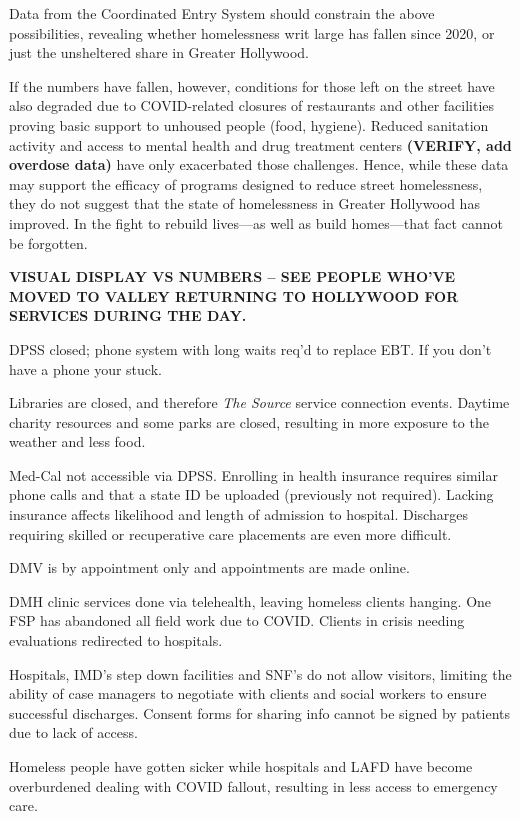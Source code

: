 \documentclass[11pt]{article}
\def\bfr{\bf\color{red}}
\begin{document}
Data from the Coordinated Entry System should constrain the above possibilities, revealing whether homelessness 
writ large has fallen since 2020, or just the unsheltered share in Greater Hollywood.

If the numbers have fallen, however, conditions for those left on the street have also degraded due to COVID-related 
closures of restaurants and other facilities proving basic support to unhoused people (food, hygiene). Reduced sanitation 
activity and access to mental health and drug treatment centers {\bfr (VERIFY, add overdose data)} have only exacerbated those challenges. 
Hence, while these data may support the efficacy of programs designed to reduce street homelessness, they do not suggest 
that the state of homelessness in Greater Hollywood has improved. In the fight to rebuild lives---as well as build homes---that fact 
cannot be forgotten.

{\bfr VISUAL DISPLAY VS NUMBERS -- SEE PEOPLE WHO'VE MOVED TO VALLEY RETURNING 
TO HOLLYWOOD FOR SERVICES DURING THE DAY.}

DPSS closed; phone system with long waits req'd to replace EBT. If you don't have a phone your stuck.

Libraries are closed, and therefore {\it The Source} service connection events. Daytime charity resources and some parks are 
closed, resulting in more exposure to the weather and less food.

Med-Cal not accessible via DPSS. Enrolling in health insurance requires similar phone calls and that a state ID be uploaded 
(previously not required). Lacking insurance affects likelihood and length of admission to hospital. Discharges requiring skilled 
or recuperative care placements are even more difficult.

DMV is by appointment only and appointments are made online.

DMH clinic services done via telehealth, leaving homeless clients hanging. One FSP has abandoned all field work due to COVID. 
Clients in crisis needing evaluations redirected to hospitals.

Hospitals, IMD's step down facilities and SNF's do not allow visitors, limiting the ability of case managers to negotiate 
with clients and social workers to ensure successful discharges. Consent forms for sharing info cannot be signed by patients 
due to lack of access.

Homeless people have gotten sicker while hospitals and LAFD have become overburdened dealing with COVID fallout, 
resulting in less access to emergency care.
\end{document}
